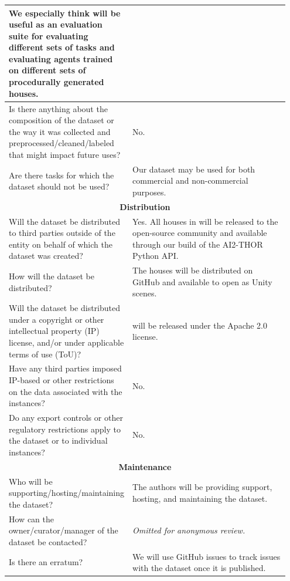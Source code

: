 \begin{longtable}{p{0.35\linewidth} |p{0.6\linewidth} }
    We especially think \elienv{} will be useful as an evaluation suite for evaluating different sets of \env{} tasks and evaluating agents trained on different sets of procedurally generated houses.\\[0.15in]
    \midrule
    Is there anything about the composition of the dataset or the way it was collected and preprocessed/cleaned/labeled that might impact future uses? & No.\\[0.15in]
    \midrule
    Are there tasks for which the dataset should not be used? & Our dataset may be used for both commercial and non-commercial purposes.\\
    \bottomrule
        \multicolumn{2}{c}{\rule{0in}{0.2in}\textbf{Distribution}\vspace{0.10in}}\\
    \toprule
    Will the dataset be distributed to third parties outside of the entity on behalf of which the dataset was created? & Yes. All houses in \elienv{} will be released to the open-source community and available through our build of the AI2-THOR Python API.\\[0.15in]
    \midrule
    How will the dataset be distributed? & The houses will be distributed on GitHub and available to open as Unity scenes.\\[0.15in]
    \midrule
    Will the dataset be distributed under a copyright or other intellectual property (IP) license, and/or under applicable terms of use (ToU)? & \elienv{} will be released under the Apache 2.0 license.\\[0.15in]
    \midrule
    Have any third parties imposed IP-based or other restrictions on the data associated with the instances? & No.\\[0.15in]
    \midrule
    Do any export controls or other regulatory restrictions apply to the dataset or to individual instances? & No.\\
    \bottomrule
        \multicolumn{2}{c}{\rule{0in}{0.2in}\textbf{Maintenance}\vspace{0.10in}}\\
    \toprule
    Who will be supporting/hosting/maintaining the dataset? & The authors will be providing support, hosting, and maintaining the dataset.\\[0.15in]
    \midrule
    How can the owner/curator/manager of the dataset be contacted? & \textit{Omitted for anonymous review.}\\[0.15in]
    \midrule
    Is there an erratum? & We will use GitHub issues to track issues with the dataset once it is published.\\[0.15in]

\end{longtable}
